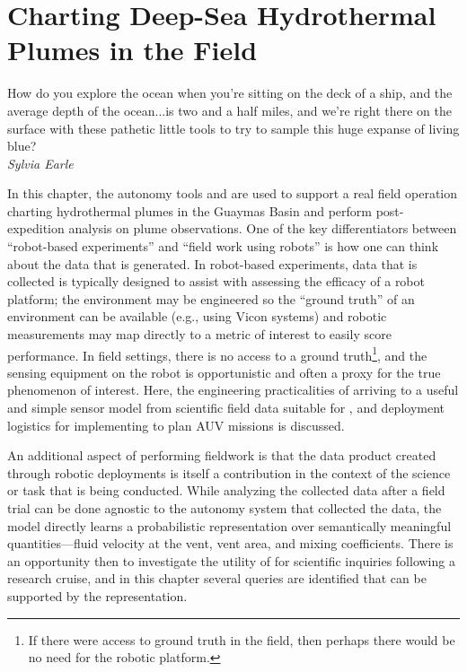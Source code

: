 \chapter{Charting Deep-Sea Hydrothermal Plumes in the Field}
\label{chap:field_results}

\begin{center}
    \begin{minipage}{0.7\textwidth}
      \begin{small}
        How do you explore the ocean when you're sitting on the deck of a ship, and the average depth of the ocean...is two and a half miles, and we're right there on the surface with these pathetic little tools to try to sample this huge expanse of living blue?\\ \emph{Sylvia Earle}
      \end{small}
    \end{minipage}
    \vspace{0.7cm}
\end{center}

In this chapter, the autonomy tools \PHORTEX and \PHUMES are used to support a real field operation charting hydrothermal plumes in the Guaymas Basin and perform post-expedition analysis on plume observations. One of the key differentiators between ``robot-based experiments'' and ``field work using robots'' is how one can think about the data that is generated. In robot-based experiments, data that is collected is typically designed to assist with assessing the efficacy of a robot platform; the environment may be engineered so the ``ground truth'' of an environment can be available (e.g., using Vicon systems) and robotic measurements may map directly to a metric of interest to easily score performance. In field settings, there is no access to a ground truth\footnote{If there were access to ground truth in the field, then perhaps there would be no need for the robotic platform.}, and the sensing equipment on the robot is opportunistic and often a proxy for the true phenomenon of interest. Here, the engineering practicalities of arriving to a useful and simple sensor model from scientific field data suitable for \PHUMES, and deployment logistics for implementing \PHORTEX to plan AUV \Sentry missions is discussed. 

An additional aspect of performing fieldwork is that the data product created through robotic deployments is itself a contribution in the context of the science or task that is being conducted. While analyzing the collected data after a field trial can be done agnostic to the autonomy system that collected the data, the \PHUMES model directly learns a probabilistic representation over semantically meaningful quantities---fluid velocity at the vent, vent area, and mixing coefficients. There is an opportunity then to investigate the utility of \PHUMES for scientific inquiries following a research cruise, and in this chapter several queries are identified that can be supported by the \PHUMES representation. 

